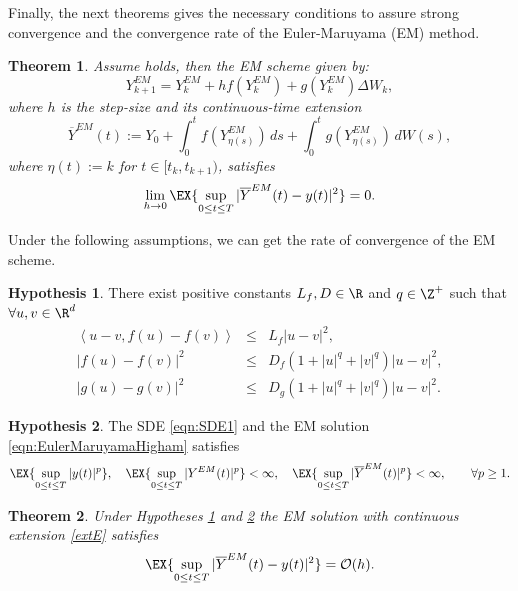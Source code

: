 \documentclass[sort&compress, preprint]{elsarticle}
\theoremstyle{definition}
\newtheorem{hypothesis}{Hypothesis}[section]
\theoremstyle{plain}%
\newtheorem{thm}{Theorem}[section]
\theoremstyle{remark}
\newcommand{\innerprod}[2]{\left\langle#1, #2\right\rangle}
\begin{document}
 Finally, the next theorems gives the necessary conditions to assure strong convergence and 
 the convergence rate of the Euler-Maruyama (EM) 
 method.  
\begin{thm}\label{thm:HighamMaoStuart}
	Assume  holds, then the EM scheme given by: 
	\begin{equation}\label{eqn:EulerMaruyamaHigham}
	Y^{EM}_{k+1}= Y^{EM}_k+hf(Y^{EM}_k) + g(Y^{EM}_k)\Delta W_k,
    \end{equation} 
	where $h$ is the step-size and its
	continuous-time  extension
	\begin{equation}\label{extE}
	\overline{Y}^{EM}(t):=Y_0+\int_0^t f (Y^{EM}_{\eta(s)})\,ds+\int_0^t g(Y^{EM}_{\eta(s)})\,dW(s),
	\end{equation}
	where $\eta(t):=k$ for $t\in[t_k,t_{k+1})$, satisfies
	\begin{equation}
		\lim_{h\to 0}
		\EX{\sup_{0\leq t\leq T}|\overline{Y}^{EM}(t)-y(t)|^2}=0.
	\end{equation}
\end{thm}	
Under the following assumptions, we can get the rate of convergence of the EM scheme.
\begin{hypothesis}\label{PolynomialGrowth}
	There exist positive constants $L_f, D\in \R$ and $q \in \Z^+$ such that $\forall u,v \in \R^d$
	\begin{eqnarray}
		\innerprod{u-v}{f(u)-f(v)}
			&\leq& L_f|u-v|^2, \nonumber \\
		|f(u) - f(v)|^2 
			&\leq& 
				D_f(1 + |u|^q +|v|^q) |u-v|^2,\nonumber
				\\
		|g(u) - g(v)|^2 
			&\leq& 
				D_g(1 + |u|^q +|v|^q) |u-v|^2.\nonumber
	\end{eqnarray}
\end{hypothesis}

\begin{hypothesis}\label{ass:MomentBounds}
	The SDE \eqref{eqn:SDE1} and the EM solution \eqref{eqn:EulerMaruyamaHigham} satisfies
	\begin{equation*}
		\EX{
			\sup_{0\leq t\leq T}
			|y(t)|^p	
		}, \quad
	\EX{
		\sup_{0\leq t\leq T}
			|Y^{EM}(t)|^p	
	}< \infty, \quad
	\EX{
		\sup_{0\leq t\leq T}
		|\overline{Y}^{EM}(t)|^p	
	} < \infty, \qquad \forall p\geq 1.
	\end{equation*}
\end{hypothesis}
\begin{thm}\label{TE}
	Under Hypotheses  \ref{PolynomialGrowth} and \ref{ass:MomentBounds} the EM solution with 
	continuous extension \eqref{extE}
	satisfies
	\begin{equation}
		\EX{
			\sup_{0\leq t \leq T}
			|\overline{Y}^{EM}(t) - y(t)|^2
		} = \mathcal{O}(h).
	\end{equation}
\end{thm}
\end{document}
